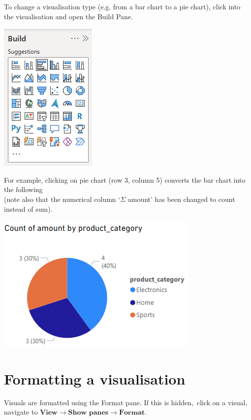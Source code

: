 \documentclass[10pt, openany, twocolumn]{book}
\begin{document}
To change a visualisation type (e.g. from a bar chart to a pie chart), click into the visualisation and open the Build Pane.

\begin{center}
    \includegraphics[width=0.35\columnwidth]{images/BuildPane.png}
\end{center}

For example, clicking on pie chart (row 3, column 5) converts the bar chart into the following \\(note also that the numerical column `$\Sigma$ amount' has been changed to count instead of sum).

\begin{center}
    \includegraphics[width=0.75\columnwidth]{images/PieChart.png}
\end{center}


\section{Formatting a visualisation}

Visuals are formatted using the Format pane. If this is hidden, click on a visual, navigate to $\textbf{View} \rightarrow \textbf{Show panes} \rightarrow \textbf{Format}$.\\
\end{document}
